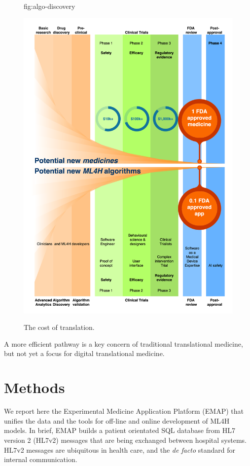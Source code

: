\documentclass[pmlr,twocolumn,10pt]{jmlr} %
\begin{document}
\begin{figure}[t]
\floatconts
  {fig:algo-discovery}
  {\caption{The cost of translation.}}
 {\includegraphics[width=1.0\linewidth]{images/emap-summary-funnel.png}}

\end{figure}

A more efficient pathway is a key concern of traditional translational medicine\citep{woolf2008}, but not yet a focus for digital translational medicine.

\section{Methods}
We report here the Experimental Medicine Application Platform (EMAP) that unifies the data and the tools for off-line and online development of ML4H models. In brief, EMAP builds a patient orientated SQL database from HL7 version 2 (HL7v2) messages that are being exchanged between hospital systems. HL7v2 messages are ubiquitous in health care, and the \textit{de facto} standard for internal communication.
\end{document}

